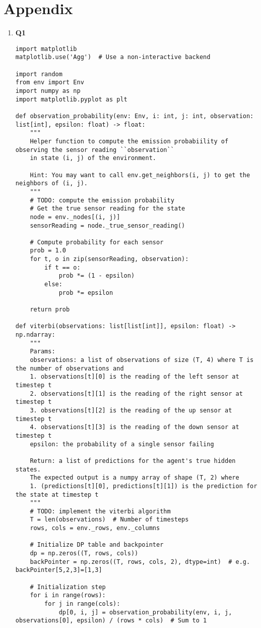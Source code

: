 \documentclass{article}
\newcommand{\Question}[1]{\Large \section{ #1 } \normalsize}
\begin{document}
\Question{Appendix}
\begin{enumerate}
    \item 
    \textbf{Q1}
    \begin{verbatim}
import matplotlib
matplotlib.use('Agg')  # Use a non-interactive backend

import random
from env import Env
import numpy as np
import matplotlib.pyplot as plt

def observation_probability(env: Env, i: int, j: int, observation: list[int], epsilon: float) -> float:
    """
    Helper function to compute the emission probabiility of observing the sensor reading ``observation``
    in state (i, j) of the environment.
    
    Hint: You may want to call env.get_neighbors(i, j) to get the neighbors of (i, j).
    """
    # TODO: compute the emission probability
    # Get the true sensor reading for the state
    node = env._nodes[(i, j)]
    sensorReading = node._true_sensor_reading()

    # Compute probability for each sensor
    prob = 1.0
    for t, o in zip(sensorReading, observation):
        if t == o:
            prob *= (1 - epsilon)
        else:
            prob *= epsilon

    return prob

def viterbi(observations: list[list[int]], epsilon: float) -> np.ndarray:
    """
    Params: 
    observations: a list of observations of size (T, 4) where T is the number of observations and
    1. observations[t][0] is the reading of the left sensor at timestep t
    2. observations[t][1] is the reading of the right sensor at timestep t
    3. observations[t][2] is the reading of the up sensor at timestep t
    4. observations[t][3] is the reading of the down sensor at timestep t
    epsilon: the probability of a single sensor failing

    Return: a list of predictions for the agent's true hidden states.
    The expected output is a numpy array of shape (T, 2) where 
    1. (predictions[t][0], predictions[t][1]) is the prediction for the state at timestep t
    """
    # TODO: implement the viterbi algorithm
    T = len(observations)  # Number of timesteps
    rows, cols = env._rows, env._columns

    # Initialize DP table and backpointer
    dp = np.zeros((T, rows, cols))
    backPointer = np.zeros((T, rows, cols, 2), dtype=int)  # e.g. backPointer[5,2,3]=[1,3]

    # Initialization step
    for i in range(rows):
        for j in range(cols):
            dp[0, i, j] = observation_probability(env, i, j, observations[0], epsilon) / (rows * cols)  # Sum to 1


\end{verbatim}
\end{enumerate}
\end{document}
